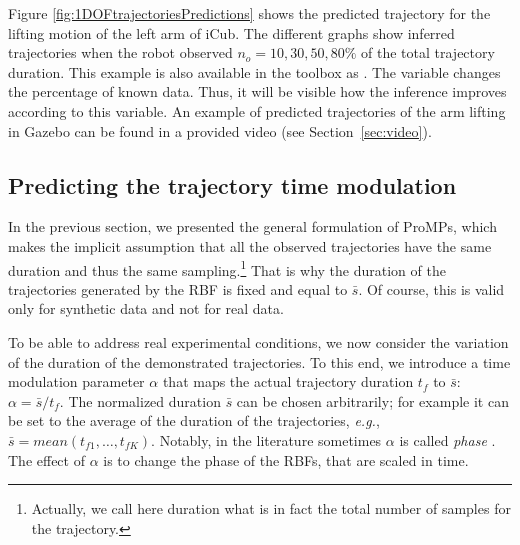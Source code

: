 \documentclass[utf8]{frontiersSCNS} %
\newcommand{\todo}[1]{\textcolor{red}{\textbf{/*#1*/}}}
\begin{document}

Figure \ref{fig:1DOFtrajectoriesPredictions} shows the predicted trajectory for the lifting motion of the left arm of iCub. The different graphs show inferred trajectories when the robot observed $n_{o}=10,30,50,80\%$ of the total trajectory duration. This example is also available in the toolbox as . 
The  variable changes the percentage of known data. Thus, it will be visible how the inference improves according to this variable. An example of predicted trajectories of the arm lifting in Gazebo can be found in a provided video (see Section~\ref{sec:video}).



\subsection{Predicting the trajectory time modulation}\label{sec:predictDuration}
In the previous section, we presented the general formulation of ProMPs, which makes the implicit assumption that all the observed trajectories have the same duration and thus the same sampling.\footnote{Actually, we call here duration what is in fact the total number of samples for the trajectory.} That is why the duration of the trajectories generated by the RBF is fixed and equal to $\bar{s}$.
Of course, this is valid only for synthetic data and not for real data.

To be able to address real experimental conditions, we now consider the variation of the  duration of the demonstrated trajectories. 
To this end, we introduce a time modulation parameter $\alpha$ that maps the actual trajectory duration $t_{f}$ to $\bar{s}$: $\alpha = \bar{s} / t_{f}$.
The normalized duration $\bar{s}$ can be chosen arbitrarily; for example it can be set to the average of the  duration of the trajectories, \textit{e.g.}, $\bar{s}=mean(t_{f1},\ldots,t_{fK})$.
Notably, in the literature sometimes $\alpha$ is called \textit{phase} \cite{paraschos2013probabilistic,paraschos2013probabilisticTrajectory}. 
The effect of $\alpha$ is to change the phase of the RBFs, that are scaled in time.
\end{document}
